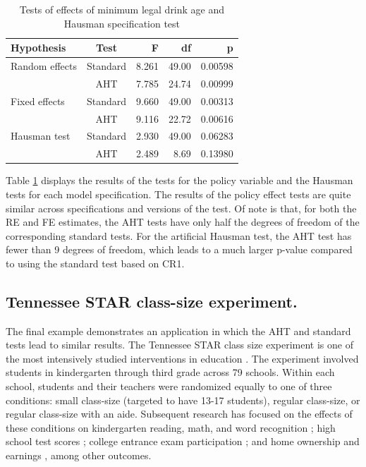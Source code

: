 \documentclass[12pt]{article}\usepackage[]{graphicx}\usepackage[]{color}
\begin{document}
\begin{table}[bth]
\centering
\begin{tabular}{lcrrr}
  \toprule
Hypothesis & Test & F & df & p \\ 
  \midrule
Random effects & Standard & 8.261 & 49.00 & 0.00598 \\ 
   & AHT & 7.785 & 24.74 & 0.00999 \\ 
  Fixed effects & Standard & 9.660 & 49.00 & 0.00313 \\ 
   & AHT & 9.116 & 22.72 & 0.00616 \\ 
   \midrule
Hausman test & Standard & 2.930 & 49.00 & 0.06283 \\ 
   & AHT & 2.489 & 8.69 & 0.13980 \\ 
   \bottomrule
\end{tabular}
\caption{Tests of effects of minimum legal drink age and Hausman specification test} 
\label{tab:MLDA}
\end{table}


Table \ref{tab:MLDA} displays the results of the tests for the policy variable and the Hausman tests for each model specification. 
The results of the policy effect tests are quite similar across specifications and versions of the test. 
Of note is that, for both the RE and FE estimates, the AHT tests have only half the degrees of freedom of the corresponding standard tests. 
For the artificial Hausman test, the AHT test has fewer than 9 degrees of freedom, which leads to a much larger p-value compared to using the standard test based on CR1. 

\subsection{Tennessee STAR class-size experiment.} 

The final example demonstrates an application in which the AHT and standard tests lead to similar results. The Tennessee STAR class size experiment is one of the most intensively studied interventions in education \citep[for a detailed review, see][]{Schanzenbach2006what}.  The experiment involved students in kindergarten through third grade across 79 schools. Within each school, students and their teachers were randomized equally to one of three conditions: small class-size (targeted to have 13-17 students), regular class-size, or regular class-size with an aide.
Subsequent research has focused on the effects of these conditions on kindergarten reading, math, and word recognition \citep{Achilles2008tennessee}; high school test scores \citep{Schanzenbach2006what}; college entrance exam participation \citep{Krueger2001effect}; and home ownership and earnings \citep{Chetty2011how}, among other outcomes.
\end{document}
